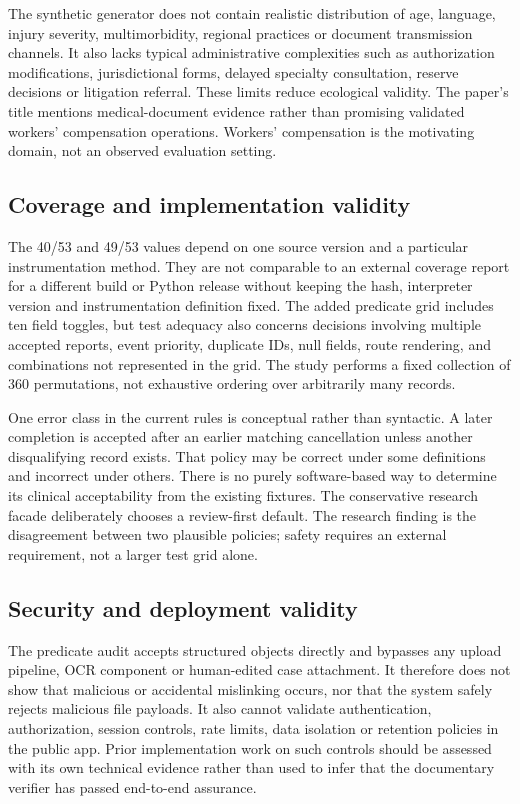 \documentclass[11pt,twocolumn]{article}
\begin{document}
The synthetic generator does not contain realistic distribution of age, language, injury severity, multimorbidity, regional practices or document transmission channels. It also lacks typical administrative complexities such as authorization modifications, jurisdictional forms, delayed specialty consultation, reserve decisions or litigation referral. These limits reduce ecological validity. The paper's title mentions medical-document evidence rather than promising validated workers' compensation operations. Workers' compensation is the motivating domain, not an observed evaluation setting.

\subsection{Coverage and implementation validity}
The 40/53 and 49/53 values depend on one source version and a particular instrumentation method. They are not comparable to an external coverage report for a different build or Python release without keeping the hash, interpreter version and instrumentation definition fixed. The added predicate grid includes ten field toggles, but test adequacy also concerns decisions involving multiple accepted reports, event priority, duplicate IDs, null fields, route rendering, and combinations not represented in the grid. The study performs a fixed collection of 360 permutations, not exhaustive ordering over arbitrarily many records.

One error class in the current rules is conceptual rather than syntactic. A later completion is accepted after an earlier matching cancellation unless another disqualifying record exists. That policy may be correct under some definitions and incorrect under others. There is no purely software-based way to determine its clinical acceptability from the existing fixtures. The conservative research facade deliberately chooses a review-first default. The research finding is the disagreement between two plausible policies; safety requires an external requirement, not a larger test grid alone.

\subsection{Security and deployment validity}
The predicate audit accepts structured objects directly and bypasses any upload pipeline, OCR component or human-edited case attachment. It therefore does not show that malicious or accidental mislinking occurs, nor that the system safely rejects malicious file payloads. It also cannot validate authentication, authorization, session controls, rate limits, data isolation or retention policies in the public app. Prior implementation work on such controls should be assessed with its own technical evidence rather than used to infer that the documentary verifier has passed end-to-end assurance.
\end{document}
